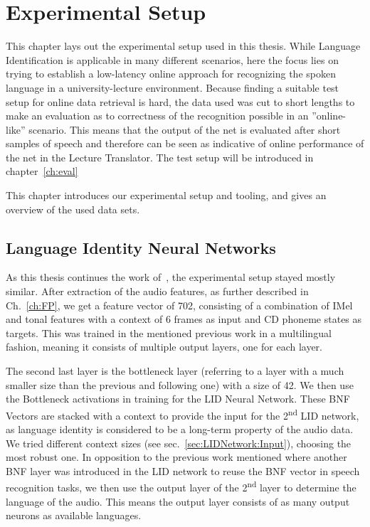 




\chapter{Experimental Setup}
\label{ch:LITasks}

This chapter lays out the experimental setup used in this thesis. While Language Identification is applicable in many different scenarios, here the focus lies on trying to establish a low-latency online approach for recognizing the spoken language in a university-lecture environment. Because finding a suitable test setup for online data retrieval is hard, the data used was cut to short lengths to make an evaluation as to correctness of the recognition possible in an ''online-like'' scenario. 
This means that the output of the net is evaluated after short samples of speech and therefore can be seen as indicative of online performance of the net in the Lecture Translator. The test setup will be introduced in chapter~\ref{ch:eval}


This chapter introduces our experimental setup and tooling, and gives an overview of the used data sets.

\section{Language Identity Neural Networks}
\label{sec:LITasks:GS}

As this thesis continues the work of~\cite{Mueller2016b}, the experimental setup stayed mostly similar. After extraction of the audio features, as further described in Ch.~\ref{ch:FP}, we get a feature vector of 702, consisting of a combination of IMel and tonal features with a context of 6 frames as input and CD phoneme states as targets. This was trained in the mentioned previous work in a multilingual fashion, meaning it consists of multiple output layers, one for each layer.

The second last layer is the bottleneck layer (referring to a layer with a much smaller size than the previous and following one) with a size of 42. We then use the Bottleneck activations in training for the LID Neural Network. These BNF Vectors are stacked with a context to provide the input for the 2\textsuperscript{nd} LID network, as language identity is considered to be a long-term property of the audio data. We tried different context sizes (see sec.~\ref{sec:LIDNetwork:Input}), choosing the most robust one.  In opposition to the previous work mentioned where another BNF layer was introduced in the LID network to reuse the BNF vector in speech recognition tasks, we then use the output layer of the 2\textsuperscript{nd} layer to determine the language of the audio. This means the output layer consists of as many output neurons as available languages.

